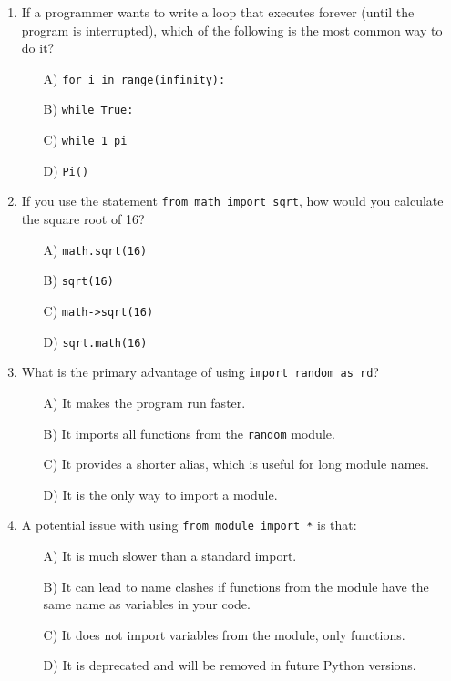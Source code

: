 \documentclass[9pt]{article}
\begin{document}
\begin{multicols}{2}
\begin{enumerate}
\item If a programmer wants to write a loop that executes forever (until the program is interrupted), which of the following is the most common way to do it?
\begin{enumerate}
    \item[A)] \texttt{for i in range(infinity):}
    \item[B)] \texttt{while True:}
    \item[C)] \texttt{while 1 pi}
    \item[D)] \texttt{Pi()}
\end{enumerate}

\item If you use the statement \texttt{from math import sqrt}, how would you calculate the square root of 16?
\begin{enumerate}
    \item[A)] \texttt{math.sqrt(16)}
    \item[B)] \texttt{sqrt(16)}
    \item[C)] \texttt{math->sqrt(16)}
    \item[D)] \texttt{sqrt.math(16)}
\end{enumerate}

\item What is the primary advantage of using \texttt{import random as rd}?
\begin{enumerate}
    \item[A)] It makes the program run faster.
    \item[B)] It imports all functions from the \texttt{random} module.
    \item[C)] It provides a shorter alias, which is useful for long module names.
    \item[D)] It is the only way to import a module.
\end{enumerate}

\item A potential issue with using \texttt{from module import *} is that:
\begin{enumerate}
    \item[A)] It is much slower than a standard import.
    \item[B)] It can lead to name clashes if functions from the module have the same name as variables in your code.
    \item[C)] It does not import variables from the module, only functions.
    \item[D)] It is deprecated and will be removed in future Python versions.
\end{enumerate}


\end{enumerate}
\end{multicols}
\end{document}
